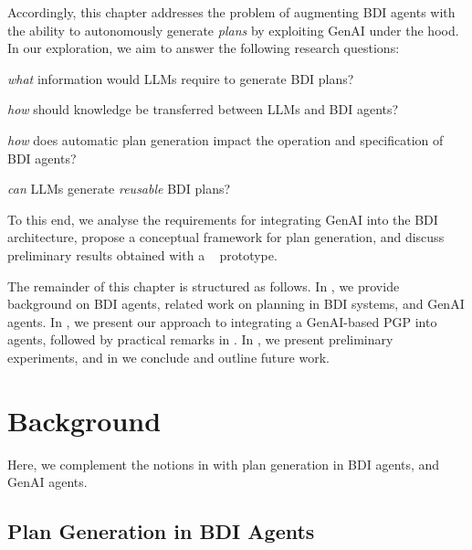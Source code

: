 Accordingly,
this chapter addresses the problem of augmenting \ac{BDI} agents with the ability to autonomously generate \emph{plans}
by exploiting \ac{GenAI} under the hood.
%
In our exploration, we aim to answer the following research questions:
%
\begin{enumerate*}[label=\textbf{(RQ\arabic*)}]
    \item\label{rq:required-info} \emph{what} information would \acp{LLM} require to generate \ac{BDI} plans?
    \item\label{rq:knowledge-transfer} \emph{how} should knowledge be transferred between \acp{LLM} and \ac{BDI} agents?
    \item\label{rq:agent-spec} \emph{how} does automatic plan generation impact the operation and specification of \ac{BDI} agents?
    \item\label{rq:reusability} \emph{can} \acp{LLM} generate \emph{reusable} \ac{BDI} plans?
\end{enumerate*}
%
To this end,
we analyse the requirements for integrating \ac{GenAI} into the \ac{BDI} architecture,
propose a conceptual framework for plan generation, and
discuss preliminary results obtained with a \jakta{}~\cite{DBLP:journals/sncs/BaiardiBCP24} prototype.

The remainder of this chapter is structured as follows.
%
In ,
we provide background on \ac{BDI} agents,
related work on planning in \ac{BDI} systems,
and \ac{GenAI} agents.
%
In ,
we present our approach to integrating a \ac{GenAI}-based \ac{PGP} into \agentspeak{} agents,
followed by practical remarks in .
%
In , we present preliminary experiments,
and in  we conclude and outline future work.

\section{Background}\label{sec:genai:background}

Here,
we complement the notions in  with
plan generation in \ac{BDI} agents, and \ac{GenAI} agents.

\subsection{Plan Generation in \ac{BDI} Agents}

